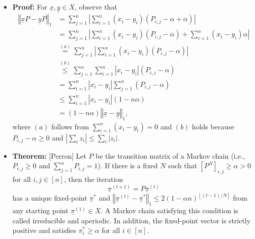 \documentclass[11pt,twoside]{report}
\newcommand{\vecnot}{\underline}
\begin{document}
\begin{itemize}
\item \textbf{Proof:} 
For $\vecnot x,\vecnot y\in X$, observe that 
\begin{align*}
\left\Vert \vecnot xP-\vecnot yP\right\Vert _{1} & =\sum_{j=1}^{n}\left|\sum_{i=1}^{n}(x_{i}-y_{i})(P_{i,j}-\alpha+\alpha)\right|\\
 & =\sum_{j=1}^{n}\left|\sum_{i=1}^{n}(x_{i}-y_{i})(P_{i,j}-\alpha)+\sum_{i=1}^{n}(x_{i}-y_{i})\alpha\right|\\
 & \stackrel{(a)}{=}\sum_{j=1}^{n}\left|\sum_{i=1}^{n}(x_{i}-y_{i})(P_{i,j}-\alpha)\right|\\
 & \stackrel{(b)}{\leq}\sum_{j=1}^{n}\sum_{i=1}^{n}\left|x_{i}-y_{i}\right|(P_{i,j}-\alpha)\\
 & =\sum_{i=1}^{n}\left|x_{i}-y_{i}\right|\sum_{j=1}^{n}(P_{i,j}-\alpha)\\
 & \leq\sum_{i=1}^{n}\left|x_{i}-y_{i}\right|(1-n\alpha)\\
 & =(1-n\alpha)\left\Vert \vecnot x-\vecnot y\right\Vert _{1},
\end{align*}
where $(a)$ follows from $\sum_{i=1}^{n}(x_{i}-y_{i})=0$ and $(b)$ holds because $P_{i,j}-\alpha\geq0$ and $\left|\sum_{i}z_{i}\right|\leq\sum_{i}\left|z_{i}\right|$.


\item \textbf{Theorem:} 
[Perron] Let $P$ be the transition matrix of a Markov chain (i.e., $P_{i,j}\geq0$ and $\sum_{j=1}^{n}P_{i,j}=1$). If there is a fixed $N$ such that $\left[P^{N}\right]_{i,j}\geq\alpha>0$ for all $i,j\in[n]$, then the iteration 
\[
\vecnot{\pi}^{(t+1)}=P\vecnot{\pi}^{(t)}
\]
has a unique fixed-point $\vecnot{\pi}^{*}$ and $\left\Vert \vecnot{\pi}^{(t)}-\vecnot{\pi}^{*}\right\Vert _{1}\leq2(1-\alpha n)^{\left\lfloor (t-1)/N\right\rfloor }$ from any starting point $\vecnot{\pi}^{(1)}\in X$. A Markov chain satisfying this condition is called irreducible and aperiodic. In addition, the fixed-point vector is strictly positive and satisfies $\pi_{i}^{*}\geq\alpha$ for all $i\in[n].$


\end{itemize}
\end{document}

